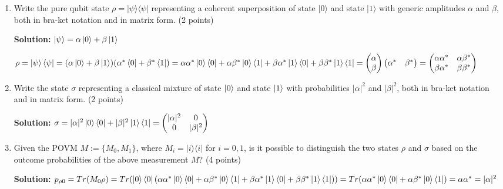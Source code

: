 \documentclass[12pt]{article}
\begin{document}
\begin{enumerate}
    \item Write the pure qubit state $\rho = |\psi\rangle\langle\psi|$ representing a coherent superposition of state $|0\rangle$ and state $|1\rangle$ with generic amplitudes $\alpha$ and $\beta$, both in bra-ket notation and in matrix form. (2 points)

          \textbf{Solution:}
          $\ket{\psi} = \alpha\ket{0}+\beta\ket{1}$

          $\rho = \ket{\psi}\bra{\psi} =
              (\alpha\ket{0}+\beta\ket{1})(\alpha^*\bra{0}+\beta^*\bra{1})=\alpha\alpha^*\ket{0}\bra{0}+
              \alpha\beta^*\ket{0}\bra{1}+\beta\alpha^*\ket{1}\bra{0}+\beta\beta^*\ket{1}\bra{1}=
              \begin{pmatrix}
                  \alpha \\
                  \beta
              \end{pmatrix}\begin{pmatrix}
                  \alpha^* & \beta^*
              \end{pmatrix} = \begin{pmatrix}
                  \alpha\alpha^* & \alpha\beta^* \\
                  \beta\alpha^*  & \beta\beta^*
              \end{pmatrix}$

    \item Write the state $\sigma$ representing a classical mixture of state $\ket{0}$ and state $\ket{1}$ with probabilities $|\alpha|^2$ and $|\beta|^2$, both in bra-ket notation and in matrix form. (2 points)

          \textbf{Solution:}
          $\sigma = |\alpha|^2\ket{0}\bra{0}+|\beta|^2\ket{1}\bra{1}=
              \begin{pmatrix}
                  |\alpha|^2 & 0         \\
                  0          & |\beta|^2
              \end{pmatrix}$

    \item Given the POVM $M := \{M_0, M_1\}$, where $M_i = |i\rangle\langle i|$ for $i = 0, 1$, is it possible to distinguish the two states $\rho$ and $\sigma$ based on the outcome probabilities of the above measurement $M$? (4 points)


          \textbf{Solution:}
          $p_{\rho0}=Tr(M_0\rho)=Tr(\ket{0}\bra{0}(\alpha\alpha^*\ket{0}\bra{0}+
              \alpha\beta^*\ket{0}\bra{1}+\beta\alpha^*\ket{1}\bra{0}+\beta\beta^*\ket{1}\bra{1}))=Tr(\alpha\alpha^*\ket{0}\bra{0}+\alpha\beta^*\ket{0}\bra{1})=\alpha\alpha^*=|\alpha|^2$


\end{enumerate}
\end{document}
